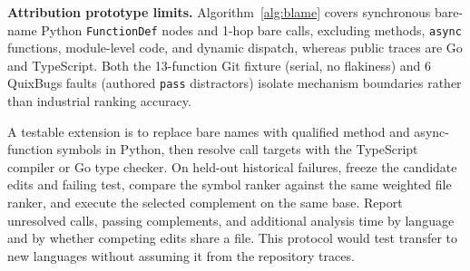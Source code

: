 \textbf{Attribution prototype limits.} Algorithm~\ref{alg:blame} covers synchronous bare-name Python \texttt{FunctionDef} nodes and 1-hop bare calls, excluding methods, \texttt{async} functions, module-level code, and dynamic dispatch, whereas public traces are Go and TypeScript. Both the 13-function Git fixture (serial, no flakiness) and 6 QuixBugs faults (authored \texttt{pass} distractors) isolate mechanism boundaries rather than industrial ranking accuracy.

A testable extension is to replace bare names with qualified method and async-function symbols in Python, then resolve call targets with the TypeScript compiler or Go type checker. On held-out historical failures, freeze the candidate edits and failing test, compare the symbol ranker against the same weighted file ranker, and execute the selected complement on the same base. Report unresolved calls, passing complements, and additional analysis time by language and by whether competing edits share a file. This protocol would test transfer to new languages without assuming it from the repository traces.
